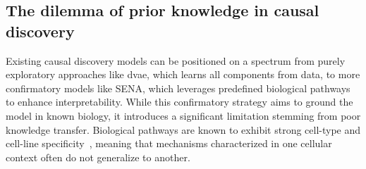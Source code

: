 \subsection*{The dilemma of prior knowledge in causal discovery}
Existing causal discovery models can be positioned on a spectrum from purely exploratory approaches like \gls{dvae}, which learns all components from data, to more confirmatory models like SENA, which leverages predefined biological pathways to enhance interpretability. While this confirmatory strategy aims to ground the model in known biology, it introduces a significant limitation stemming from poor knowledge transfer. Biological pathways are known to exhibit strong cell-type and cell-line specificity~\cite{schneider2017tissue,gamazon2018using,walter2019biological,hekselman2020mechanisms}, meaning that mechanisms characterized in one cellular context often do not generalize to another.

